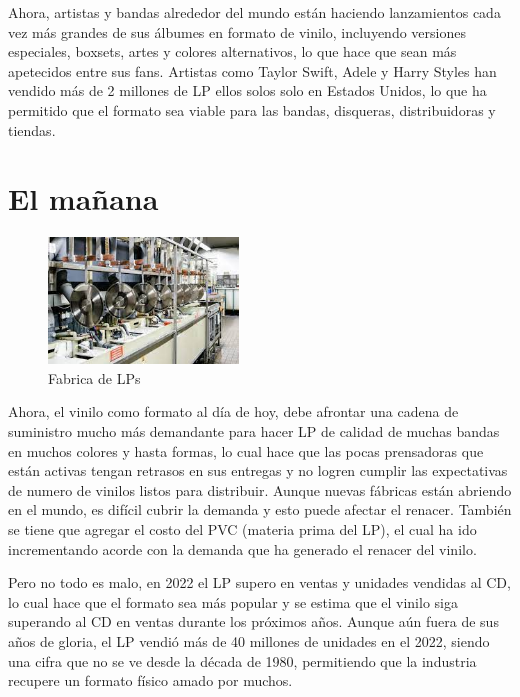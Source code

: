 \documentclass{article}
\begin{document}
    Ahora, artistas y bandas alrededor del mundo están haciendo lanzamientos cada vez más grandes de sus álbumes en formato de vinilo, incluyendo versiones especiales, boxsets, artes y colores alternativos, lo que hace que sean más apetecidos entre sus fans. Artistas como Taylor Swift, Adele y Harry Styles han vendido más de 2 millones de LP ellos solos solo en Estados Unidos, lo que ha permitido que el formato sea viable para las bandas, disqueras, distribuidoras y tiendas.\cite{hustle}\cite{wikirevival}

\section{El mañana}

\begingroup
\setlength{\intextsep}{0pt}%
\setlength{\columnsep}{0pt}%

\begin{figure}
    \centering
    \includegraphics[width=0.45\textwidth]{images/factory.jpg}
    \vspace{-5pt}
    \caption{Fabrica de LPs}
\end{figure}

Ahora, el vinilo como formato al día de hoy, debe afrontar una cadena de suministro mucho más demandante para hacer LP de calidad de muchas bandas en muchos colores y hasta formas, lo cual hace que las pocas prensadoras que están activas tengan retrasos en sus entregas y no logren cumplir las expectativas de numero de vinilos listos para distribuir. Aunque nuevas fábricas están abriendo en el mundo, es difícil cubrir la demanda y esto puede afectar el renacer. También se tiene que agregar el costo del PVC (materia prima del LP), el cual ha ido incrementando acorde con la demanda que ha generado el renacer del vinilo.\cite{hustle}\\

\endgroup

Pero no todo es malo, en 2022 el LP supero en ventas y unidades vendidas al CD, lo cual hace que el formato sea más popular y se estima que el vinilo siga superando al CD en ventas durante los próximos años. Aunque aún fuera de sus años de gloria, el LP vendió más de 40 millones de unidades en el 2022, siendo una cifra que no se ve desde la década de 1980, permitiendo que la industria recupere un formato físico amado por muchos.\\

\printbibliography[
title={Bibliografía}
]
\end{document}
